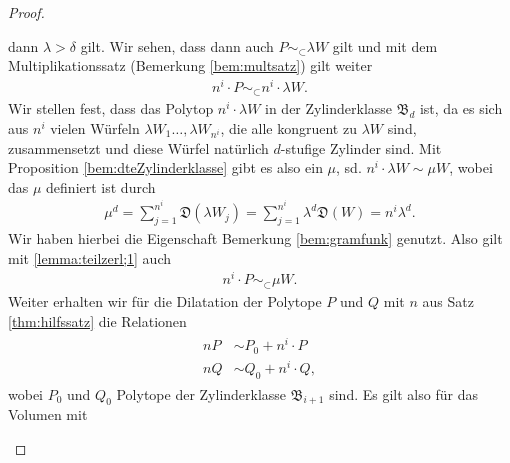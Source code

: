 \documentclass[11pt,titlepage]{article}
\theoremstyle{definition}
\theoremstyle{remark}
\begin{document}
\begin{proof}
\begin{itemize}
			dann $\lambda>\delta$ gilt. Wir sehen, dass dann auch 
			$P\sim_{\subset}\lambda W$ gilt und mit dem 
			Multiplikationssatz (Bemerkung \ref{bem:multsatz}) gilt weiter
			\begin{align}
				n^i\cdot P\sim_{\subset}n^i \cdot \lambda W.\label{lemma:teilzerl;1}
			\end{align}
			Wir stellen fest, dass das Polytop $n^i\cdot \lambda W$ 
			in der Zylinderklasse $\mathfrak{B}_d$ ist, da es sich 
			aus $n^i$ vielen Würfeln $\lambda W_1\ldots,\lambda W_{n^i}$, 
			die alle kongruent zu $\lambda W$ sind, 
			zusammensetzt und diese Würfel 
			natürlich $d$-stufige Zylinder sind. Mit Proposition 
			\ref{bem:dteZylinderklasse} gibt es also ein $\mu$, sd. 
			$n^i\cdot \lambda W\sim \mu W$, wobei das $\mu$ definiert 
			ist durch
			\begin{align}
				\mu^d =\sum_{j=1}^{n^i}\mathfrak{D}(\lambda W_j)
				=\sum_{j=1}^{n^i}\lambda^d \mathfrak{D}(W)=
				n^i\lambda^d. \label{lemma:teilzerl;5}
			\end{align}
			Wir haben hierbei die Eigenschaft Bemerkung \ref{bem:gramfunk} 
			genutzt. Also gilt mit \ref{lemma:teilzerl;1} auch
			\begin{align}
				n^i\cdot P\sim_{\subset} \mu W.\label{lemma:teilzerl;2}
			\end{align}
			Weiter erhalten wir für die Dilatation der 
			Polytope $P$ und $Q$ mit $n$ aus Satz \ref{thm:hilfssatz} 
			die Relationen
			\begin{align}
				\begin{split}
					nP&\sim P_0+ n^i\cdot P \\
					nQ&\sim Q_0+ n^i\cdot Q, \label{lemma:teilzerl;3}
				\end{split}
			\end{align}
			wobei $P_0$ und $Q_0$ Polytope der Zylinderklasse 
			$\mathfrak{B}_{i+1}$ sind. Es gilt also für das Volumen mit 
			
			

\end{itemize}
\end{proof}
\end{document}
